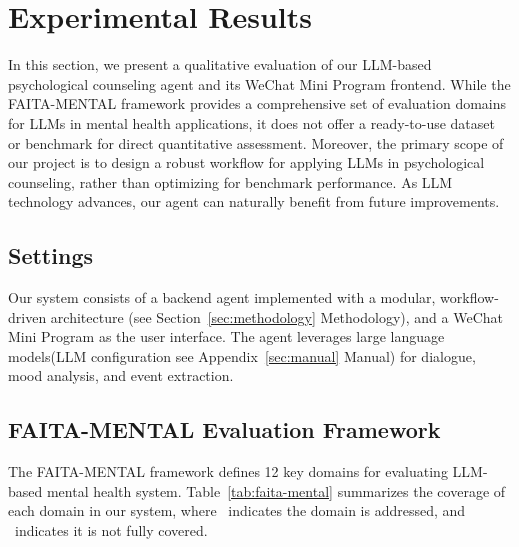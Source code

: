 \section{Experimental Results}
\label{sec:results}

In this section, we present a qualitative evaluation of our LLM-based psychological counseling agent and its WeChat Mini Program frontend. While the FAITA-MENTAL framework\cite{golden2024describing} provides a comprehensive set of evaluation domains for LLMs in mental health applications, it does not offer a ready-to-use dataset or benchmark for direct quantitative assessment. Moreover, the primary scope of our project is to design a robust workflow for applying LLMs in psychological counseling, rather than optimizing for benchmark performance. As LLM technology advances, our agent can naturally benefit from future improvements.

\subsection{Settings}

Our system consists of a backend agent implemented with a modular, workflow-driven architecture (see Section~\ref{sec:methodology} Methodology), and a WeChat Mini Program as the user interface. The agent leverages large language models(LLM configuration see Appendix~\ref{sec:manual} Manual) for dialogue, mood analysis, and event extraction.

\subsection{FAITA-MENTAL Evaluation Framework}

The FAITA-MENTAL framework defines 12 key domains for evaluating LLM-based mental health system. Table~\ref{tab:faita-mental} summarizes the coverage of each domain in our system, where \checkmark~indicates the domain is addressed, and \xmark~indicates it is not fully covered.



